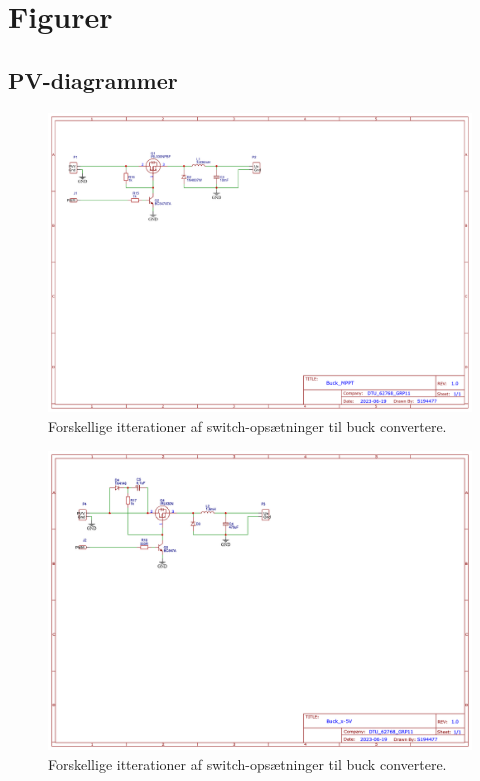 \section{Figurer}
\subsection{PV-diagrammer}

    \begin{figure}[H]
    \includegraphics[width=\textwidth]{Dokumentation/Figures/PV_Buck_MPPT.png}
    \caption{Forskellige itterationer af switch-opsætninger til buck convertere.}
    \end{figure}

    \begin{figure}[H]
    \includegraphics[width=\textwidth]{Dokumentation/Figures/PV_Buck_x-5V.png}
    \caption{Forskellige itterationer af switch-opsætninger til buck convertere.}
    \end{figure}

